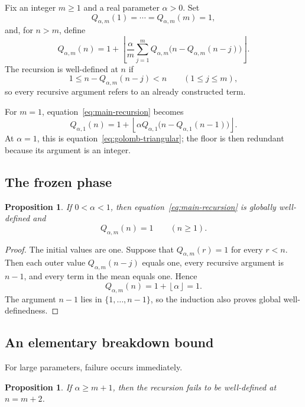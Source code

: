 \documentclass[11pt]{article}
\newtheorem{proposition}[theorem]{Proposition}
\theoremstyle{definition}
\theoremstyle{remark}
\newcommand{\floor}[1]{\left\lfloor #1\right\rfloor}
\begin{document}
Fix an integer $m\ge1$ and a real parameter $\alpha>0$.  Set
\begin{equation}\label{eq:initial-data}
Q_{\alpha,m}(1)=\cdots=Q_{\alpha,m}(m)=1,
\end{equation}
and, for $n>m$, define
\begin{equation}\label{eq:main-recursion}
Q_{\alpha,m}(n)
=
1+\floor{
\frac{\alpha}{m}\sum_{j=1}^{m}
Q_{\alpha,m}\bigl(n-Q_{\alpha,m}(n-j)\bigr)
}.
\end{equation}
The recursion is well-defined at $n$ if
\begin{equation}\label{eq:admissible-indices}
1\le n-Q_{\alpha,m}(n-j)<n
\qquad (1\le j\le m),
\end{equation}
so every recursive argument refers to an already constructed term.

For $m=1$, equation~\eqref{eq:main-recursion} becomes
\[
Q_{\alpha,1}(n)
=1+\floor{\alpha
Q_{\alpha,1}\bigl(n-Q_{\alpha,1}(n-1)\bigr)}.
\]
At $\alpha=1$, this is equation~\eqref{eq:golomb-triangular}; the floor is
then redundant because its argument is an integer.

\subsection{The frozen phase}

\begin{proposition}\label{prop:subcritical}
If $0<\alpha<1$, then equation~\eqref{eq:main-recursion} is globally
well-defined and
\[
Q_{\alpha,m}(n)=1
\qquad (n\ge1).
\]
\end{proposition}

\begin{proof}
The initial values are one.  Suppose that $Q_{\alpha,m}(r)=1$ for every
$r<n$.  Then each outer value $Q_{\alpha,m}(n-j)$ equals one, every recursive
argument is $n-1$, and every term in the mean equals one.  Hence
\[
Q_{\alpha,m}(n)=1+\floor{\alpha}=1.
\]
The argument $n-1$ lies in $\{1,\ldots,n-1\}$, so the induction also proves
global well-definedness.
\end{proof}

\subsection{An elementary breakdown bound}

For large parameters, failure occurs immediately.

\begin{proposition}\label{prop:large-alpha-breakdown}
If $\alpha\ge m+1$, then the recursion fails to be well-defined at
$n=m+2$.
\end{proposition}
\end{document}
